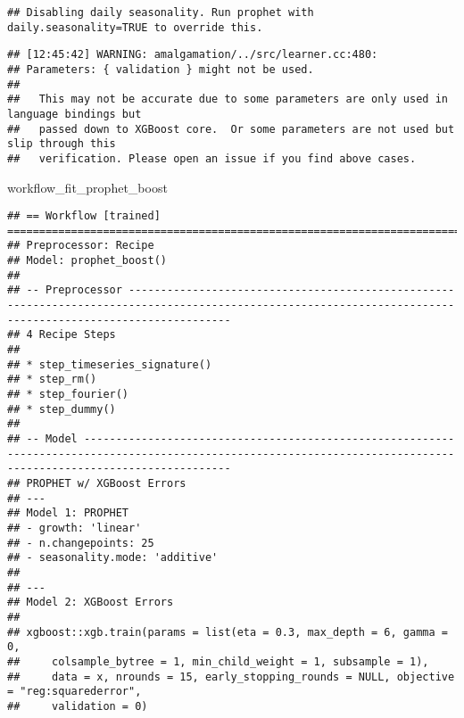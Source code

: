 \documentclass[
]{article}
\newenvironment{Shaded}{\begin{snugshade}}{\end{snugshade}}
\newcommand{\DataTypeTok}[1]{\textcolor[rgb]{0.13,0.29,0.53}{#1}}
\newcommand{\KeywordTok}[1]{\textcolor[rgb]{0.13,0.29,0.53}{\textbf{#1}}}
\newcommand{\NormalTok}[1]{#1}
\newcommand{\OperatorTok}[1]{\textcolor[rgb]{0.81,0.36,0.00}{\textbf{#1}}}
\newcommand{\OtherTok}[1]{\textcolor[rgb]{0.56,0.35,0.01}{#1}}
\newcommand{\StringTok}[1]{\textcolor[rgb]{0.31,0.60,0.02}{#1}}
\begin{document}
\begin{Shaded}
\end{Shaded}

\begin{verbatim}
## Disabling daily seasonality. Run prophet with daily.seasonality=TRUE to override this.
\end{verbatim}

\begin{verbatim}
## [12:45:42] WARNING: amalgamation/../src/learner.cc:480: 
## Parameters: { validation } might not be used.
## 
##   This may not be accurate due to some parameters are only used in language bindings but
##   passed down to XGBoost core.  Or some parameters are not used but slip through this
##   verification. Please open an issue if you find above cases.
\end{verbatim}

\begin{Shaded}
\begin{Highlighting}[]
\NormalTok{workflow_fit_prophet_boost}
\end{Highlighting}
\end{Shaded}

\begin{verbatim}
## == Workflow [trained] ======================================================================================================================================================
## Preprocessor: Recipe
## Model: prophet_boost()
## 
## -- Preprocessor ------------------------------------------------------------------------------------------------------------------------------------------------------------
## 4 Recipe Steps
## 
## * step_timeseries_signature()
## * step_rm()
## * step_fourier()
## * step_dummy()
## 
## -- Model -------------------------------------------------------------------------------------------------------------------------------------------------------------------
## PROPHET w/ XGBoost Errors
## ---
## Model 1: PROPHET
## - growth: 'linear'
## - n.changepoints: 25
## - seasonality.mode: 'additive'
## 
## ---
## Model 2: XGBoost Errors
## 
## xgboost::xgb.train(params = list(eta = 0.3, max_depth = 6, gamma = 0, 
##     colsample_bytree = 1, min_child_weight = 1, subsample = 1), 
##     data = x, nrounds = 15, early_stopping_rounds = NULL, objective = "reg:squarederror", 
##     validation = 0)
\end{verbatim}
\end{document}
